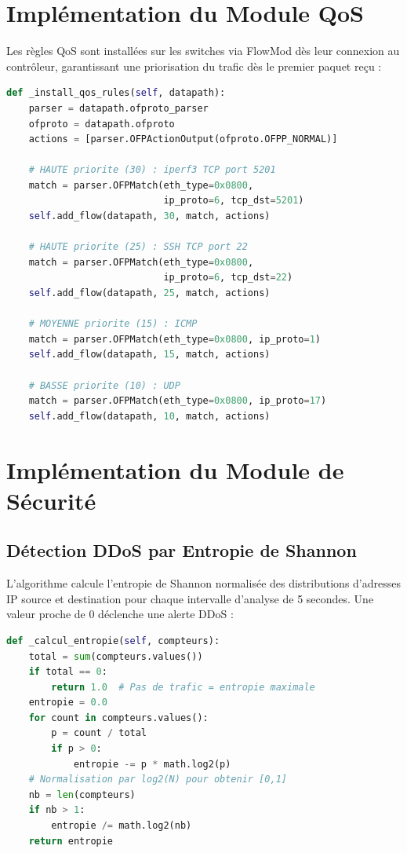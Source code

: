 \documentclass[12pt,a4paper]{report}
\begin{document}
\section{Implémentation du Module QoS}
Les règles QoS sont installées sur les switches via
FlowMod dès leur connexion au contrôleur, garantissant
une priorisation du trafic dès le premier paquet reçu :

\begin{lstlisting}[language=Python,
caption=Installation des règles QoS (qos.py)]
def _install_qos_rules(self, datapath):
    parser = datapath.ofproto_parser
    ofproto = datapath.ofproto
    actions = [parser.OFPActionOutput(ofproto.OFPP_NORMAL)]

    # HAUTE priorite (30) : iperf3 TCP port 5201
    match = parser.OFPMatch(eth_type=0x0800,
                            ip_proto=6, tcp_dst=5201)
    self.add_flow(datapath, 30, match, actions)

    # HAUTE priorite (25) : SSH TCP port 22
    match = parser.OFPMatch(eth_type=0x0800,
                            ip_proto=6, tcp_dst=22)
    self.add_flow(datapath, 25, match, actions)

    # MOYENNE priorite (15) : ICMP
    match = parser.OFPMatch(eth_type=0x0800, ip_proto=1)
    self.add_flow(datapath, 15, match, actions)

    # BASSE priorite (10) : UDP
    match = parser.OFPMatch(eth_type=0x0800, ip_proto=17)
    self.add_flow(datapath, 10, match, actions)
\end{lstlisting}

\section{Implémentation du Module de Sécurité}

\subsection{Détection DDoS par Entropie de Shannon}
L'algorithme calcule l'entropie de Shannon normalisée
des distributions d'adresses IP source et destination
pour chaque intervalle d'analyse de 5 secondes. Une
valeur proche de 0 déclenche une alerte DDoS :

\begin{lstlisting}[language=Python,
caption=Calcul de l'entropie de Shannon (ddos\_detector.py)]
def _calcul_entropie(self, compteurs):
    total = sum(compteurs.values())
    if total == 0:
        return 1.0  # Pas de trafic = entropie maximale
    entropie = 0.0
    for count in compteurs.values():
        p = count / total
        if p > 0:
            entropie -= p * math.log2(p)
    # Normalisation par log2(N) pour obtenir [0,1]
    nb = len(compteurs)
    if nb > 1:
        entropie /= math.log2(nb)
    return entropie
\end{lstlisting}
\end{document}
